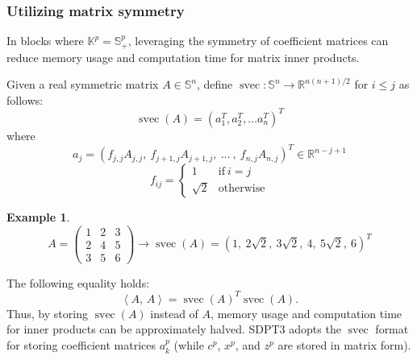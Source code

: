 \documentclass{scrartcl}
\newtheorem{example}{Example}
\newcommand{\inprod}[2]{\left\langle #1, \, #2 \right\rangle}
\begin{document}
\subsubsection{Utilizing matrix symmetry}
In blocks where $\mathbb{K}^p=\mathbb{S}_+^p$, leveraging the symmetry of coefficient matrices can reduce memory usage and computation time for matrix inner products.

Given a real symmetric matrix $A\in \mathbb{S}^n$, define $\operatorname{svec}: \mathbb{S}^n \rightarrow \mathbb{R}^{n(n+1)/2}$ for $i\leq j$ as follows:
\[ \operatorname{svec}(A)= (a_1^T, a_2^T, \ldots a_n^T)^T \]
where
\[ a_j = (f_{j,j} A_{j,j}, ~ f_{j+1,j}A_{j+1,j}, ~ \ldots ~ , ~ f_{n,j} A_{n,j})^T \in \mathbb{R}^{n-j+1} \]
\[ f_{ij}= \begin{cases} 1 & \text{if} ~ i=j \\ \sqrt{2} & \text{otherwise} \end{cases}\]

\begin{example}
\[A = \begin{pmatrix}
    1 & 2 & 3\\
    2 & 4 & 5\\
    3 & 5 & 6
\end{pmatrix} \rightarrow \operatorname{svec}(A) = (1, ~ 2\sqrt{2}, ~ 3\sqrt{2}, ~ 4, ~ 5\sqrt{2}, ~ 6)^T\]
\end{example}

The following equality holds:
\[\inprod{A}{A} = \operatorname{svec}(A)^T \operatorname{svec}(A).\]
Thus, by storing $\operatorname{svec}(A)$ instead of $A$, memory usage and computation time for inner products can be approximately halved.
SDPT3 adopts the $\operatorname{svec}$ format for storing coefficient matrices $a^p_k$ (while $c^p$, $x^p$, and $z^p$ are stored in matrix form).
\end{document}

